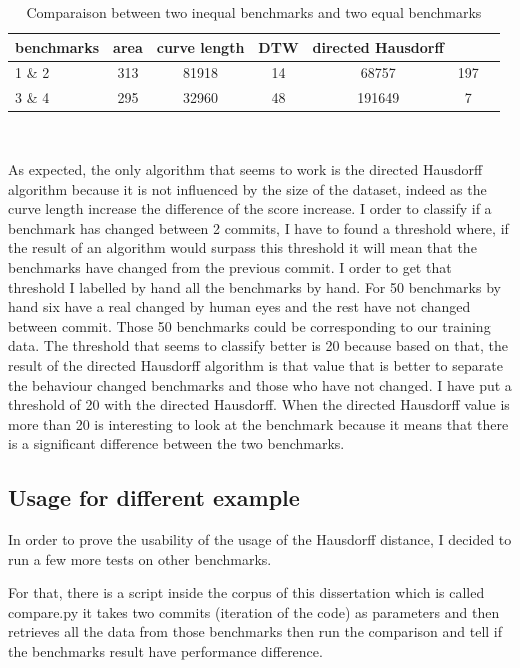 \documentclass{article}
\begin{document}
\begin{table}[h!]
\begin{tabular}{|l|c|c|c|c|c|c|}
   \hline
   benchmarks  & area & curve length & DTW & directed Hausdorff \\
   \hline
   1 \&  2 & 313 & 81918 & 14 & 68757 & 197\\
   \hline
   3 \& 4  & 295 & 32960 & 48 & 191649 & 7 \\
   \hline
\end{tabular} \\ 
\caption{Comparaison between two inequal benchmarks and two equal benchmarks}
\label{result}
\end{table}


As expected, the only algorithm that seems to work is the directed Hausdorff algorithm because it is not influenced by the size of the dataset, indeed as the curve length increase the difference of the score increase. 
I order to classify if a benchmark has changed between 2 commits, I have to found a threshold where, if the result of an algorithm would surpass this threshold it will mean that the benchmarks have changed from the previous commit. I order to get that threshold I labelled by hand all the benchmarks by hand. For 50 benchmarks by hand six have a real changed by human eyes and the rest have not changed between commit. Those 50 benchmarks could be corresponding to our training data. The threshold that seems to classify better is 20 because based on that, the result of the directed Hausdorff algorithm is that value that is better to separate the behaviour changed benchmarks and those who have not changed.
I have put a threshold of 20 with the directed Hausdorff. When the directed Hausdorff value is more than 20 is interesting to look at the benchmark because it means that there is a significant difference between the two benchmarks.


\subsection{Usage for different example}


In order to prove the usability of the usage of the Hausdorff distance, I decided to run a few more tests on other benchmarks.

For that, there is a script inside the corpus of this dissertation which is called compare.py it takes two commits (iteration of the code) as parameters and then retrieves all the data from those benchmarks then run the comparison and tell if the benchmarks result have performance difference. \\
\end{document}

